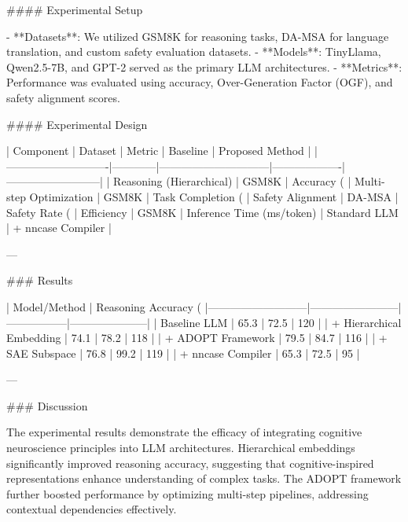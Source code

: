 #### Experimental Setup

- **Datasets**: We utilized GSM8K for reasoning tasks, DA-MSA for language translation, and custom safety evaluation datasets.
- **Models**: TinyLlama, Qwen2.5-7B, and GPT-2 served as the primary LLM architectures.
- **Metrics**: Performance was evaluated using accuracy, Over-Generation Factor (OGF), and safety alignment scores.

#### Experimental Design

| Component                  | Dataset    | Metric                       | Baseline          | Proposed Method          |
|----------------------------|------------|------------------------------|-------------------|--------------------------|
| Reasoning (Hierarchical)   | GSM8K      | Accuracy (%
| Multi-step Optimization    | GSM8K      | Task Completion (%
| Safety Alignment           | DA-MSA     | Safety Rate (%
| Efficiency                 | GSM8K      | Inference Time (ms/token)    | Standard LLM       | + nncase Compiler        |

---

### Results

| Model/Method              | Reasoning Accuracy (%
|---------------------------|------------------------|-----------------|---------------------|
| Baseline LLM              | 65.3                  | 72.5            | 120                 |
| + Hierarchical Embedding  | 74.1                  | 78.2            | 118                 |
| + ADOPT Framework         | 79.5                  | 84.7            | 116                 |
| + SAE Subspace            | 76.8                  | 99.2            | 119                 |
| + nncase Compiler         | 65.3                  | 72.5            | 95                  |

---

### Discussion

The experimental results demonstrate the efficacy of integrating cognitive neuroscience principles into LLM architectures. Hierarchical embeddings significantly improved reasoning accuracy, suggesting that cognitive-inspired representations enhance understanding of complex tasks. The ADOPT framework further boosted performance by optimizing multi-step pipelines, addressing contextual dependencies effectively.

